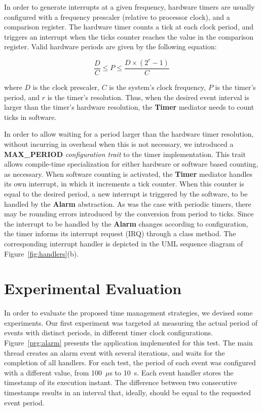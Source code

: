 \documentclass[final,3pd,times]{elsarticle}
\newcommand{\fig}[4][tbp]{
  \begin{figure}[#1]
    {\centering{\texttt{[image: \#2]}}\par}
    \caption{#3}
    \label{fig:#2}
  \end{figure}
}
\newcommand{\class}[1]{{\sffamily\bfseries{#1}}}
\newcommand{\method}[1]{\class{#1}}
\begin{document}
In order to generate interrupts at a given frequency, hardware timers
are usually configured with a frequency prescaler (relative to processor
clock), and a comparison register. The hardware timer counts a tick at
each clock period, and triggers an interrupt when the ticks counter
reaches the value in the comparison register.  Valid hardware periods
are given by the following equation:

\begin{equation}
\frac{D}{C}  \leq  P \leq  \frac{D \times (2^{r} - 1)}{C} 
\label{eq:period}
\end{equation}

\noindent where $D$ is the clock prescaler, $C$ is the system's clock
frequency, $P$ is the timer's period, and $r$ is the timer's resolution.
Thus, when the desired event interval is larger than the timer's
hardware resolution, the \class{Timer} mediator needs to count ticks in
software.

In order to allow waiting for a period larger than the hardware timer
resolution, without incurring in overhead when this is not necessary, we
introduced a \method{MAX\_PERIOD} \emph{configuration trait} to the
timer implementation. This trait allows compile-time specialization for
either hardware or software based counting, as necessary. When software
counting is activated, the \class{Timer} mediator handles its own
interrupt, in which it increments a tick counter. When this counter is
equal to the desired period, a new interrupt is triggered by the
software, to be handled by the \class{Alarm} abstraction. As was the
case with periodic timers, there may be rounding errors introduced by
the conversion from period to ticks. Since the interrupt to be handled
by the \class{Alarm} changes according to configuration, the timer
informs its interrupt request (IRQ) through a class method.  The
corresponding interrupt handler is depicted in the UML sequence diagram
of Figure~\ref{fig:handlers}(b).


\section{Experimental Evaluation}\label{sec:case}

In order to evaluate the proposed time management strategies, we devised
some experiments. Our first experiment was targeted at measuring the
actual period of events with distinct periods, in different timer clock
configurations.  Figure~\ref{prg:alarm} presents the application
implemented for this test. The main thread creates an alarm event with
several iterations, and waits for the completion of all handlers. For
each test, the period of each event was configured with a different
value, from 100~$\mu$s to 10~s. Each event handler stores the timestamp
of its execution instant. The difference between two consecutive
timestamps results in an interval that, ideally, should be equal to the
requested event period.
\end{document}
